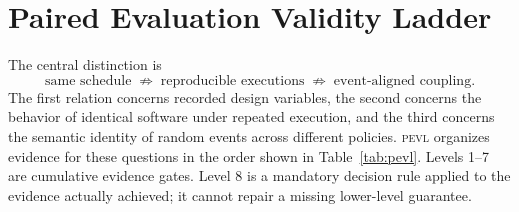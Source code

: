 \documentclass[aps,reprint,superscriptaddress,longbibliography,floatfix]{revtex4-2}
\newcommand{\PEVL}{\textsc{pevl}}
\begin{document}
\section{Paired Evaluation Validity Ladder}

The central distinction is
\begin{equation}
 \text{same schedule}\;\nRightarrow\;\text{reproducible executions}
 \;\nRightarrow\;\text{event-aligned coupling}.
 \label{eq:distinction}
\end{equation}
The first relation concerns recorded design variables, the second concerns the
behavior of identical software under repeated execution, and the third concerns
the semantic identity of random events across different policies.  \PEVL
organizes evidence for these questions in the order shown in
Table~\ref{tab:pevl}.  Levels 1--7 are cumulative evidence gates.  Level 8 is a
mandatory decision rule applied to the evidence actually achieved; it cannot
repair a missing lower-level guarantee.
\end{document}
